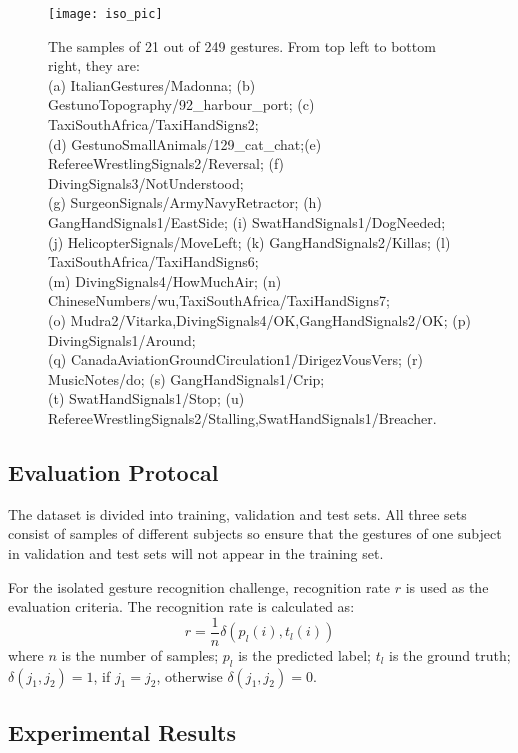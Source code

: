 \documentclass[10pt, a4paper, conference]{IEEEtran}
\begin{document}
\begin{figure*}[t]
\begin{center}
{\texttt{[image: iso\_pic]}}
\end{center}
\caption{The samples of 21 out of 249 gestures. From top left to bottom right, they are: \\(a) ItalianGestures/Madonna; (b) GestunoTopography/92\_harbour\_port; (c) TaxiSouthAfrica/TaxiHandSigns2;\\ (d) GestunoSmallAnimals/129\_cat\_chat;(e) RefereeWrestlingSignals2/Reversal; (f) DivingSignals3/NotUnderstood;\\(g) SurgeonSignals/ArmyNavyRetractor; (h) GangHandSignals1/EastSide; (i) SwatHandSignals1/DogNeeded;\\(j) HelicopterSignals/MoveLeft; (k) GangHandSignals2/Killas; (l) TaxiSouthAfrica/TaxiHandSigns6;\\ (m) DivingSignals4/HowMuchAir; (n) ChineseNumbers/wu,TaxiSouthAfrica/TaxiHandSigns7;\\ (o) Mudra2/Vitarka,DivingSignals4/OK,GangHandSignals2/OK; (p) DivingSignals1/Around;\\(q) CanadaAviationGroundCirculation1/DirigezVousVers; (r) MusicNotes/do; (s) GangHandSignals1/Crip;\\ (t) SwatHandSignals1/Stop; (u) RefereeWrestlingSignals2/Stalling,SwatHandSignals1/Breacher.}
\label{fig:samples}
\end{figure*}


\subsection{Evaluation Protocal}

The dataset is divided into training, validation and test sets. All three sets consist of samples of different subjects so ensure that the gestures of one subject in validation and test sets will not appear in the training set. 

For the isolated gesture recognition challenge, recognition rate $r$ is used as the evaluation criteria. The recognition rate is calculated as:
\begin{equation}
r = \dfrac{1}{n}\delta(p_{l}(i),t_{l}(i))
\end{equation}
where $n$ is the number of samples; $p_{l}$ is the predicted label; $t_{l}$ is the ground truth; $\delta(j_{1},j_{2}) = 1$, if $j_{1} = j_{2}$, otherwise $\delta(j_{1},j_{2}) = 0$. 
 
 
\subsection{Experimental Results}
\end{document}

